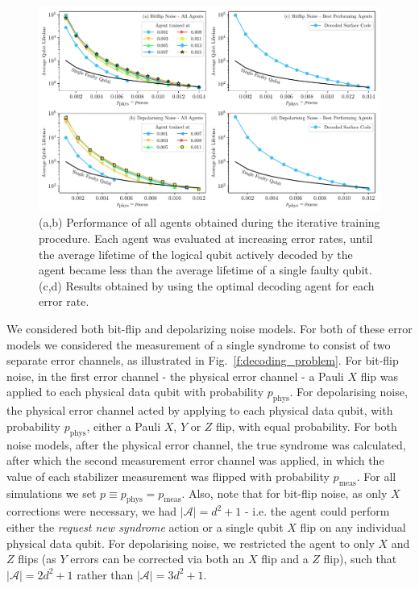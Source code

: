 \documentclass[twocolumn,preprintnumbers,amsmath,amssymb,notitlepage,nofootinbib,longbibliography,superscriptaddress,aps,pra,10pt]{revtex4-1}
\begin{document}
	\begin{figure}
		\centering
		\includegraphics[width=\linewidth]{figures/final_results.pdf}
		\caption{
			(a,b) Performance of all agents obtained during the iterative training procedure.
			Each agent was evaluated at increasing error rates, until the average lifetime of the logical qubit actively decoded by the agent became less than the average lifetime of a single faulty qubit.
			(c,d) Results obtained by using the optimal decoding agent for each error rate.
		}
		\label{f:results}
	\end{figure}

	We considered both bit-flip and depolarizing noise models.
	For both of these error models we considered the measurement of a single syndrome to consist of two separate error channels, as illustrated in Fig.~\ref{f:decoding_problem}.
	For bit-flip noise, in the first error channel - the physical error channel - a Pauli $X$ flip was applied to each physical data qubit with probability $p_{\mathrm{phys}}$.
	For depolarising noise, the physical error channel acted by applying to each physical data qubit, with probability $p_{\mathrm{phys}}$, either a Pauli $X$, $Y$ or $Z$ flip, with equal probability.
	For both noise models, after the physical error channel, the true syndrome was calculated, after which the second measurement error channel was applied, in which the value of each stabilizer measurement was flipped with probability $p_{\mathrm{meas}}$.
	For all simulations we set $p \equiv p_{\mathrm{phys}} = p_{\mathrm{meas}}$.
	Also, note that for bit-flip noise, as only $X$ corrections were necessary, we had $|\mathcal{A}| = d^2 + 1$ - i.e. the agent could perform either the \textit{request new syndrome} action or a single qubit $X$ flip on any individual physical data qubit.
	For depolarising noise, we restricted the agent to only $X$ and $Z$ flips (as $Y$ errors can be corrected via both an $X$ flip and a $Z$ flip), such that $|\mathcal{A}| = 2d^2 + 1$ rather than $|\mathcal{A}| = 3d^2 + 1$.
\end{document}
